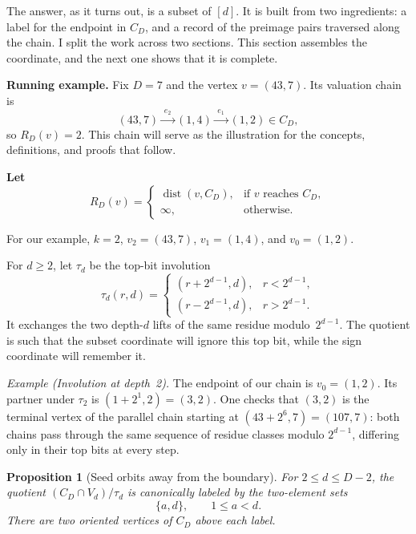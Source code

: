 \documentclass[11pt]{amsart}
\newtheorem{proposition}[theorem]{Proposition}
\theoremstyle{definition}
\theoremstyle{remark}
\begin{document}
The answer, as it turns out, is a subset of $[d]$.  It is built from two ingredients: a
label for the endpoint in $C_D$, and a record of the preimage pairs
traversed along the chain.  I split the work across two sections.  This
section assembles the coordinate, and the next one shows that it is
complete.

\textbf{Running example.}
Fix $D=7$ and the vertex $v=(43,7)$.  Its valuation chain is
\[
  (43,7)\xrightarrow{\;e_2\;}(1,4)\xrightarrow{\;e_1\;}(1,2)\in C_D,
\]
so $R_D(v)=2$.  This chain will serve as the illustration for the concepts, definitions, and proofs 
that follow.

\textbf{Let}
\[
R_D(v)=
\begin{cases}
\operatorname{dist}(v,C_D), & \text{if } v \text{ reaches } C_D,\\
\infty, & \text{otherwise.}
\end{cases}
\]

\begin{center}
\end{center}

For our example, $k=2$, $v_2=(43,7)$, $v_1=(1,4)$, and $v_0=(1,2)$.

For $d\ge2$, let $\tau_d$ be the top-bit involution
\[
\tau_d(r,d)=
\begin{cases}
(r+2^{d-1},d),&r<2^{d-1},\\
(r-2^{d-1},d),&r>2^{d-1}.
\end{cases}
\]
It exchanges the two depth-$d$ lifts of the same residue modulo~$2^{d-1}$.
The quotient is such that the subset coordinate will ignore this
top bit, while the sign coordinate will remember it.

\textit{Example (Involution at depth~2).}
The endpoint of our chain is $v_0=(1,2)$.  Its partner under $\tau_2$ is
$(1+2^1,2)=(3,2)$.  One checks that $(3,2)$ is the terminal vertex of the
parallel chain starting at $(43+2^6,7)=(107,7)$: both chains pass through
the same sequence of residue classes modulo $2^{d-1}$, differing only in
their top bits at every step.

\begin{proposition}[Seed orbits away from the boundary]\label{prop:seeds}
For $2\le d\le D-2$, the quotient $(C_D\cap V_d)/\tau_d$ is
canonically labeled by the two-element sets
\[
\{a,d\},\qquad 1\le a<d.
\]
There are two oriented vertices of $C_D$ above each label.
\end{proposition}
\end{document}
